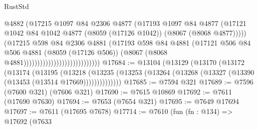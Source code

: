 \begin{lexlean}{RustStd}
\begin{coremodule}
{\begin{coremodule}
{{{{{{{{{{{{{{{{{{{{{{{{{{{{{{{{{{                                                  @4882
                                                  (@17215
                                                    @1097
                                                    @84
                                                    @2306
                                                    @4877
                                                    (@17193
                                                      @1097
                                                      @84
                                                      @4877
                                                      (@17121
                                                        @1042
                                                        @84
                                                        @1042
                                                        @4877
                                                        (@8059 (@17126 @1042))
                                                        (@8067 (@8068 @4877)))))
                                                  (@17215
                                                    @598
                                                    @84
                                                    @2306
                                                    @4881
                                                    (@17193
                                                      @598
                                                      @84
                                                      @4881
                                                      (@17121
                                                        @506
                                                        @84
                                                        @506
                                                        @4881
                                                        (@8059 (@17126 @506))
                                                        (@8067
                                                          (@8068 @4881))))))))))))))))))))))))))))
@17684 := @13104
    (@13129
      (@13170
        (@13172
          (@13174
            (@13195
              (@13218
                (@13235 (@13253 (@13264 (@13268 (@13327 (@13390 (@13453 (@13514 @17669))))))))))))))
@17685 := @7594 @321
@17689 := @7596 (@7600 @321) (@7606 @321)
@17690 := @7615 @10869
@17692 := @7611 (@17690 @7630)
@17694 := @7653 (@7654 @321)
@17695 := @7649 @17694
@17697 := @7611 (@17695 @7678)
@17714 := @7610
    (fun (fn : @134) =>
    @17692
      (@7633
}}}}}}}}}}}}}}}}}}}}}}}}}}}}}}}}}}
\end{coremodule}}
\end{coremodule}
\end{lexlean}
